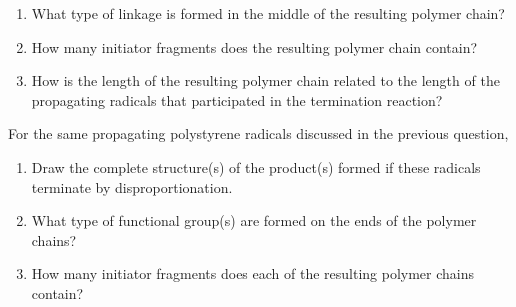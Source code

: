 \begin{activity}
\begin{ctqs}
\begin{enumerate}
				\begin{solution}[1.5in]
				\end{solution}
			
			\item What type of linkage is formed in the middle of the resulting polymer chain?
	
				\begin{solution}[0.5in]
				\end{solution}
			
			\item How many initiator fragments does the resulting polymer chain contain?
	
				\begin{solution}[0.5in]
				\end{solution}
			
			\item How is the length of the resulting polymer chain related to the length of the propagating radicals that participated in the termination reaction?
	
				\begin{solution}[0.5in]
				\end{solution}
				
		\end{enumerate}
		
	\question For the same propagating polystyrene radicals discussed in the previous question,
	
		\begin{enumerate}
			\item Draw the complete structure(s) of the product(s) formed if these radicals terminate by disproportionation.
	
				\begin{solution}[1.5in]
				\end{solution}
			
			\item What type of functional group(s) are formed on the ends of the polymer chains?
	
				\begin{solution}[0.5in]
				\end{solution}
			
			\item How many initiator fragments does each of the resulting polymer chains contain?
	
				\begin{solution}[0.5in]
				\end{solution}
			

\end{enumerate}
\end{ctqs}
\end{activity}
